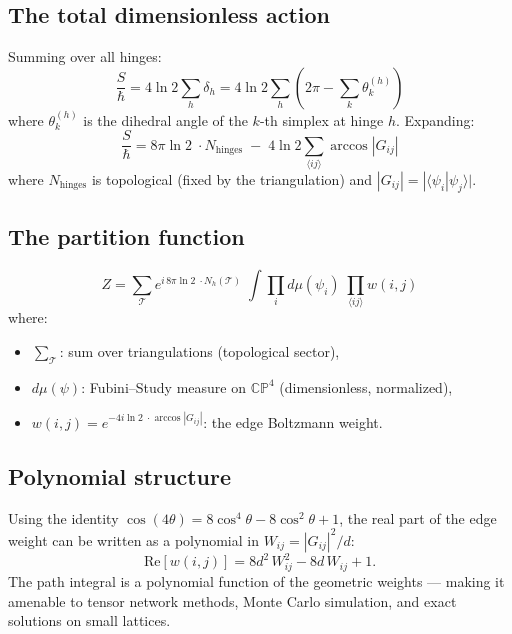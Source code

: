\documentclass[12pt]{article}
\theoremstyle{remark}
\theoremstyle{definition}
\begin{document}
\subsection{The total dimensionless action}

Summing over all hinges:
\begin{equation}
\frac{S}{\hbar} = 4\ln 2\sum_h \delta_h = 4\ln 2\sum_h \left(2\pi - \sum_{k} \theta_k^{(h)}\right)
\end{equation}
where $\theta_k^{(h)}$ is the dihedral angle of the $k$-th simplex at hinge $h$. Expanding:
\begin{equation}
\boxed{\frac{S}{\hbar} = 8\pi\ln 2\;\cdot N_\text{hinges} \;-\; 4\ln 2\!\!\sum_{\langle ij\rangle}\!\! \arccos|G_{ij}|}
\end{equation}
where $N_\text{hinges}$ is topological (fixed by the triangulation) and $|G_{ij}| = |\langle\psi_i|\psi_j\rangle|$.

\subsection{The partition function}

\begin{equation}
\boxed{Z = \sum_{\mathcal{T}} e^{i\,8\pi\ln 2\;\cdot N_h(\mathcal{T})}\;\int\!\prod_i d\mu(\psi_i)\;\prod_{\langle ij\rangle} w(i,j)}
\end{equation}
where:
\begin{itemize}
\item $\sum_\mathcal{T}$: sum over triangulations (topological sector),
\item $d\mu(\psi)$: Fubini--Study measure on $\mathbb{CP}^4$ (dimensionless, normalized),
\item $w(i,j) = e^{-4i\ln 2\;\cdot\arccos|G_{ij}|}$: the edge Boltzmann weight.
\end{itemize}

\subsection{Polynomial structure}

Using the identity $\cos(4\theta) = 8\cos^4\theta - 8\cos^2\theta + 1$, the real part of the edge weight can be written as a polynomial in $W_{ij} = |G_{ij}|^2/d$:
\begin{equation}
\text{Re}[w(i,j)] = 8d^2\,W_{ij}^2 - 8d\,W_{ij} + 1.
\end{equation}
The path integral is a polynomial function of the geometric weights --- making it amenable to tensor network methods, Monte Carlo simulation, and exact solutions on small lattices.
\end{document}
